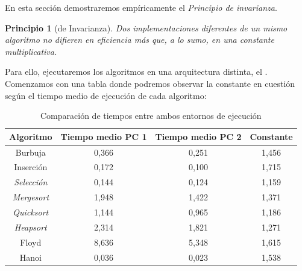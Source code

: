 \documentclass[12pt,spanish]{article}
\newtheorem{ppio}{Principio }
\begin{document}
En esta sección demostraremos empíricamente el \emph{Principio de invarianza}.
\begin{ppio}[de Invarianza]
Dos implementaciones diferentes de un  mismo  algoritmo  no  difieren  en  eficiencia  más  que,  a  lo  sumo,  en  una constante multiplicativa.
\end{ppio}
Para ello, ejecutaremos los algoritmos en una arquitectura distinta, el \textit{}.
Comenzamos con una tabla donde podremos observar la constante en cuestión según el tiempo medio de ejecución de cada algoritmo:
\begin{table}[H]
\centering
\begin{tabular}{|c|c|c|c|}
\hline
\textbf{Algoritmo} & \textbf{Tiempo medio PC 1} & \textbf{Tiempo medio PC 2} & \textbf{Constante} \\
\hline
Burbuja & 0,366 & 0,251 & 1,456\\
\hline
Inserción & 0,172 & 0,100 & 1,715\\
\hline
\textit{Selección} & 0,144 & 0,124 & 1,159\\
\hline
\textit{Mergesort} & 1,948 & 1,422 & 1,371\\
\hline
\textit{Quicksort} & 1,144 & 0,965 & 1,186\\
\hline
\textit{Heapsort} & 2,314 & 1,821 & 1,271\\
\hline
Floyd & 8,636 & 5,348 & 1,615\\
\hline
Hanoi & 0,036 & 0,023 & 1,538\\
\hline
\end{tabular}
\caption{Comparación de tiempos entre ambos entornos de ejecución}
\end{table}
\end{document}
